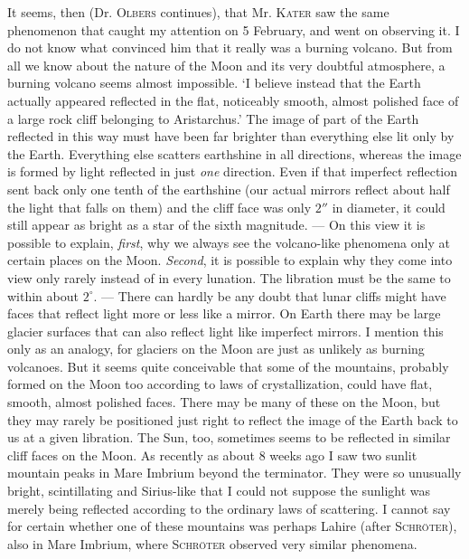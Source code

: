 It seems, then (Dr. \textsc{Olbers} continues), that Mr. \textsc{Kater} saw the same phenomenon that caught my attention on 5 February, and went on observing it. I do not know what convinced him that it really was a burning volcano. But from all we know about the nature of the Moon and its very doubtful atmosphere, a burning volcano seems almost impossible. `I believe instead that the Earth actually appeared reflected in the flat, noticeably smooth, almost polished face of a large rock cliff belonging to Aristarchus.' The image of part of the Earth reflected in this way must have been far brighter than everything else lit only by the Earth. Everything else scatters earthshine in all directions, whereas the image is formed by light reflected in just \emph{one} direction. Even if that imperfect reflection sent back only one tenth of the earthshine (our actual mirrors reflect about half the light that falls on them) and the cliff face was only $2''$ in diameter, it could still appear as bright as a star of the sixth magnitude. --- On this view it is possible to explain, \emph{first}, why we always see the volcano-like phenomena only at certain places on the Moon. \emph{Second}, it is possible to explain why they come into view only rarely instead of in every lunation. The libration must be the same to within about $2^\circ$. --- There can hardly be any doubt that lunar cliffs might have faces that reflect light more or less like a mirror. On Earth there may be large glacier surfaces that can also reflect light like imperfect mirrors. I mention this only as an analogy, for glaciers on the Moon are just as
%
unlikely as burning volcanoes. But it seems quite conceivable that some of the mountains, probably formed on the Moon too according to laws of crystallization, could have flat, smooth, almost polished faces. There may be many of these on the Moon, but they may rarely be positioned just right to reflect the image of the Earth back to us at a given libration. The Sun, too, sometimes seems to be reflected in similar cliff faces on the Moon. As recently as about 8 weeks ago I saw two sunlit mountain peaks in Mare Imbrium beyond the terminator. They were so unusually bright, scintillating and Sirius-like that I could not suppose the sunlight was merely being reflected according to the ordinary laws of scattering. I cannot say for certain whether one of these mountains was perhaps Lahire (after \textsc{Schröter}), also in Mare Imbrium, where \textsc{Schröter} observed very similar phenomena.

